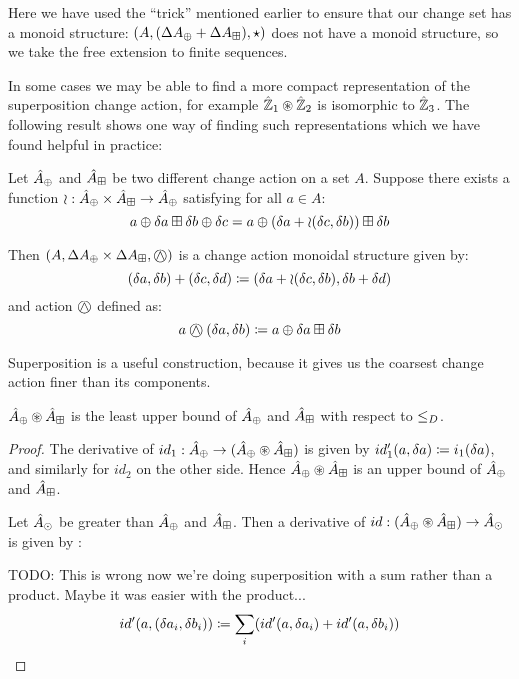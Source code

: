 Here we have used the ``trick'' mentioned earlier to ensure that our change
set has a monoid structure: $(A,(\Delta A_\oplus +
  \Delta A_\boxplus),\star)$ does not have a monoid structure, so we take
the free extension to finite sequences.

In some cases we may be able to find a more compact representation of the
superposition change action, for example $\hat{\mathbb{Z}}_1 \circledast \hat{\mathbb{Z}}_2$ is 
isomorphic to $\hat{\mathbb{Z}}_3$. The following result shows one way of finding such representations which
we have found helpful in practice:

\begin{prop}
  Let $\hat{A}_\oplus$ and $\hat{A}_\boxplus$ be two different change action on
  a set $A$. Suppose there exists a function
  $\wr : \hat{A}_\oplus \times \hat{A}_\boxplus \rightarrow \hat{A}_\oplus$ satisfying for
  all $a \in A$:
  $$
    a \oplus \delta a \boxplus \delta b \oplus \delta c
    = a \oplus (\delta a + \wr(\delta c,\delta b)) \boxplus \delta b
  $$

  Then $\cstruct{A}{\changes{A}_\cplus \times \changes{A}_\cpluss}{\cplussym{\wedge}}$
  is a change action monoidal structure given by:
  $$
    (\delta a, \delta b) + (\delta c, \delta d) \coloneqq 
    (\delta a + \wr(\delta c, \delta b), \delta b + \delta d)
  $$
  and action $\cplussym{\wedge}$ defined as:
  $$
    a \cplussym{\wedge} (\change{a}, \change{b}) \defeq a \cplus \change{a} \cpluss \change{b}
  $$
\end{prop}

Superposition is a useful construction, because it gives us the coarsest
change action finer than its components.

\begin{corollary}
  $\hat{A}_\oplus \circledast \hat{A}_\boxplus$ is the least upper bound of $\hat{A}_\oplus$ and $\hat{A}_\boxplus$ with respect to $\leq_D$.
\end{corollary}
\ifproofs
\begin{proof}
  The derivative of $id_1: \hat{A}_\oplus \rightarrow (\hat{A}_\oplus \circledast
  \hat{A}_\boxplus)$ is given by $id_1'(a, \delta a) \coloneqq 
  i_1(\delta a)$, and similarly for $id_2$ on the other side. Hence $\hat{A}_\oplus \circledast \hat{A}_\boxplus$ 
  is an upper bound of $\hat{A}_\oplus$ and $\hat{A}_\boxplus$.

  Let $\hat{A}_\odot$ be greater than $\hat{A}_\oplus$ and $\hat{A}_\boxplus$.
  Then a
  derivative of $id: (\hat{A}_\oplus \circledast \hat{A}_\boxplus) \rightarrow \hat{A}_\odot$ is
  given by :

  TODO: This is wrong now we're doing superposition with a sum rather than a
  product. Maybe it was easier with the product...
  $$
  id'(a, (\delta a_i, \delta b_i)) \coloneqq 
    \sum_i (id'(a, \delta a_i) + id'(a, \delta b_i))
  $$
\end{proof}
\fi

